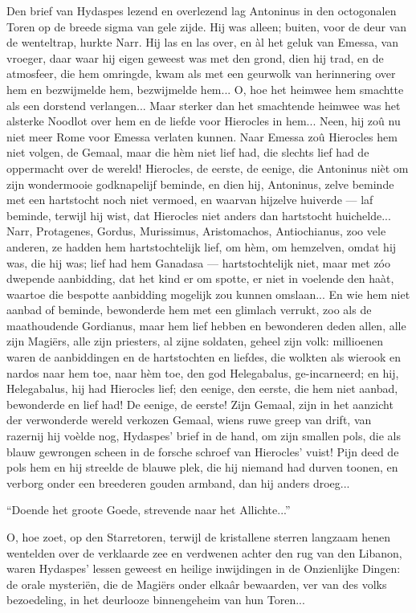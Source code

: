 \documentclass[a4paper, 12pt, oneside, dutch]{article}
\begin{document}
Den brief van Hydaspes lezend en overlezend lag Antoninus in den octogonalen Toren op de breede sigma van gele zijde. Hij was alleen; buiten, voor de deur van de wenteltrap, hurkte Narr. Hij las en las over, en àl het geluk van Emessa, van vroeger, daar waar hij eigen geweest was met den grond, dien hij trad, en de atmosfeer, die hem omringde, kwam als met een geurwolk van herinnering over hem en bezwijmelde hem, bezwijmelde hem... O, hoe het heimwee hem smachtte als een dorstend verlangen... Maar sterker dan het smachtende heimwee was het alsterke Noodlot over hem en de liefde voor Hierocles in hem... Neen, hij zoû nu niet meer Rome voor Emessa verlaten kunnen. Naar Emessa zoû Hierocles hem niet volgen, de Gemaal, maar die hèm niet lief had, die slechts lief had de oppermacht over de wereld! Hierocles, de eerste, de eenige, die Antoninus nièt om zijn wondermooie godknapelijf beminde, en dien hij, Antoninus, zelve beminde met een hartstocht noch niet vermoed, en waarvan hijzelve huiverde --- laf beminde, terwijl hij wist, dat Hierocles niet anders dan hartstocht huichelde... Narr, Protagenes, Gordus, Murissimus, Aristomachos, Antiochianus, zoo vele anderen, ze hadden hem hartstochtelijk lief, om hèm, om hemzelven, omdat hij was, die hij was; lief had hem Ganadasa --- hartstochtelijk niet, maar met zóo dwepende aanbidding, dat het kind er om spotte, er niet in voelende den haàt, waartoe die bespotte aanbidding mogelijk zou kunnen omslaan... En wie hem niet aanbad of beminde, bewonderde hem met een glimlach verrukt, zoo als de maathoudende Gordianus, maar hem lief hebben en bewonderen deden allen, alle zijn Magiërs, alle zijn priesters, al zijne soldaten, geheel zijn volk: millioenen waren de aanbiddingen en de hartstochten en liefdes, die wolkten als wierook en nardos naar hem toe, naar hèm toe, den god Helegabalus, ge-incarneerd; en hij, Helegabalus, hij had Hierocles lief; den eenige, den eerste, die hem niet aanbad, bewonderde en lief had! De eenige, de eerste! Zijn Gemaal, zijn in het aanzicht der verwonderde wereld verkozen Gemaal, wiens ruwe greep van drift, van razernij hij voèlde nog, Hydaspes' brief in de hand, om zijn smallen pols, die als blauw gewrongen scheen in de forsche schroef van Hierocles' vuist! Pijn deed de pols hem en hij streelde de blauwe plek, die hij niemand had durven toonen, en verborg onder een breederen gouden armband, dan hij anders droeg...

"`Doende het groote Goede, strevende naar het Allichte..."'

O, hoe zoet, op den Starretoren, terwijl de kristallene sterren langzaam henen wentelden over de verklaarde zee en verdwenen achter den rug van den Libanon, waren Hydaspes' lessen geweest en heilige inwijdingen in de Onzienlijke Dingen: de orale mysteriën, die de Magiërs onder elkaâr bewaarden, ver van des volks bezoedeling, in het deurlooze binnengeheim van hun Toren...
\end{document}

